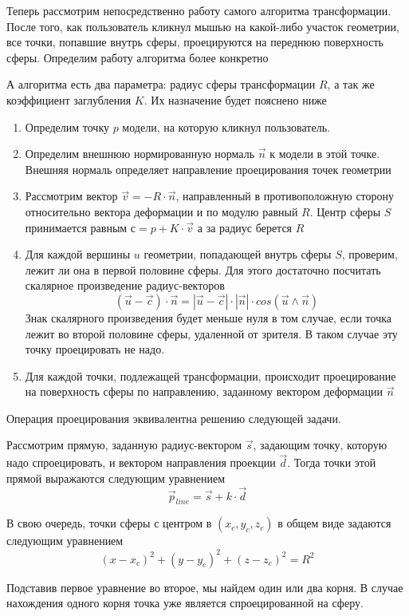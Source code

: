 \documentclass[12pt, a4paper]{article}
\begin{document}
Теперь рассмотрим непосредственно работу самого алгоритма трансформации. После
того, как пользователь кликнул мышью на какой-либо участок геометрии, все точки,
попавшие внутрь сферы, проецируются на переднюю поверхность сферы. Определим
работу алгоритма более конкретно

А алгоритма есть два параметра: радиус сферы трансформации $R$, а так же
коэффициент заглубления $K$. Их назначение будет пояснено ниже

\begin{enumerate}
    \item Определим точку $p$ модели, на которую кликнул пользователь.
    \item Определим внешнюю нормированную нормаль $\vec{n}$ к модели в этой
    точке. Внешняя нормаль определяет направление проецирования точек геометрии
    \item Рассмотрим вектор $\vec{v} = - R \cdot \vec{n}$,
    направленный в противоположную сторону относительно вектора деформации и по
    модулю равный $R$. Центр сферы $S$ принимается равным $с = p + K \cdot \vec{v}$
    а за радиус берется $R$
    \item Для каждой вершины $u$ геометрии, попадающей внутрь сферы $S$, проверим,
    лежит ли она в первой половине сферы. Для этого достаточно посчитать
    скалярное произведение радиус-векторов
    $$(\vec{u}-\vec{c}) \cdot \vec{n} = |\vec{u}-\vec{c}| \cdot |\vec{n}| \cdot
    cos(\vec{u} \wedge \vec{n})$$
    Знак скалярного произведения будет меньше нуля в том случае,
    если точка лежит во второй половине сферы, удаленной от зрителя. В таком
    случае эту точку проецировать не надо.
    \item Для каждой точки, подлежащей трансформации, происходит проецирование на
    поверхность сферы по направлению, заданному вектором деформации $\vec{n}$
\end{enumerate}

Операция проецирования эквивалентна решению следующей задачи.

Рассмотрим прямую, заданную радиус-вектором $\vec{s}$, задающим точку, которую
надо спроецировать, и вектором направления проекции $\vec{d}$. Тогда точки этой
прямой выражаются следующим уравнением
$$ \vec{p}_{line} = \vec{s} + k \cdot \vec{d} $$

В свою очередь, точки сферы с центром в $(x_c, y_c, z_c)$ в общем виде задаются
следующим уравнением
$$ (x-x_c)^2 + (y-y_c)^2 + (z-z_c)^2 = R^2 $$

Подставив первое уравнение во второе, мы найдем один или два корня. В случае
нахождения одного корня точка уже является спроецированной на сферу.
\end{document}
